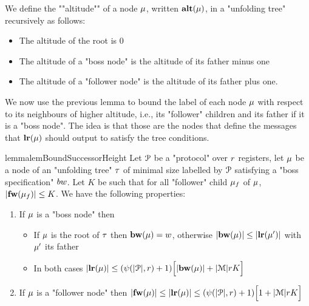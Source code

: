 \begin{definition}
	We define the ""altitude"" of a node $\mu$, written $\mathbf{alt}(\mu)$, in a "unfolding tree" recursively as follows:
	\begin{itemize}
		\item The altitude of the root is $0$
		
		\item The altitude of a "boss node" is the altitude of its father minus one
		
		\item The altitude of a "follower node" is the altitude of its father plus one.
	\end{itemize}
\end{definition}

We now use the previous lemma to bound the label of each node $\mu$ with respect to its neighbours of higher altitude, i.e., its "follower" children and its father if it is a "boss node". The idea is that those are the nodes that define the messages that $\mathbf{lr}(\mu)$ should output to satisfy the tree conditions.

\begin{restatable}{lemma}{lemBoundSuccessorHeight}
	\label{lem:bound-successor-height}
	Let $\mathcal{P}$ be a "protocol" over $r$ registers, let $\mu$ be a node of an "unfolding tree" $\tau$ of minimal size labelled by $\mathcal{P}$ satisfying a "boss specification" $\bossspec$.
	Let $K$ be such that for all "follower" child $\mu_f$ of $\mu$, $|\mathbf{fw}(\mu_f)| \leq K$.
	We have the following properties:
	
	\begin{enumerate}				
		\item  If $\mu$ is a "boss node" then 
		\begin{itemize}
			\item If $\mu$ is the root of $\tau$ then $\mathbf{bw}(\mu) = w$, otherwise $|\mathbf{bw}(\mu)| \leq |\mathbf{lr}(\mu')|$ with $\mu'$ its father
			
			\item In both cases $|\mathbf{lr}(\mu)| \leq (\psi(|\mathcal{P}|,r) + 1)\Big[ |\mathbf{bw}(\mu)| + |\mathcal{M}|rK \Big]$
		\end{itemize}
		
		\item If $\mu$ is a "follower node" then  $|\mathbf{fw}(\mu)| \leq |\mathbf{lr}(\mu)| \leq (\psi(|\mathcal{P}|,r) +1)\Big[ 1 + |\mathcal{M}|rK \Big]$
			
	\end{enumerate}
\end{restatable}


